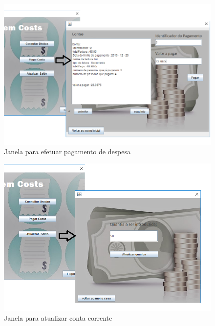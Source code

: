 \begin{figure}[h!]
	\centering
	\includegraphics[scale=0.6]{imagens/interface/pagarcontamorador}  
	\caption{Janela para efetuar pagamento de despesa}  
\end{figure}

\begin{figure}[h!]
	\centering
	\includegraphics[scale=0.6]{imagens/interface/atualizarsaldomorador}  
	\caption{Janela para atualizar conta corrente}  
\end{figure}


















